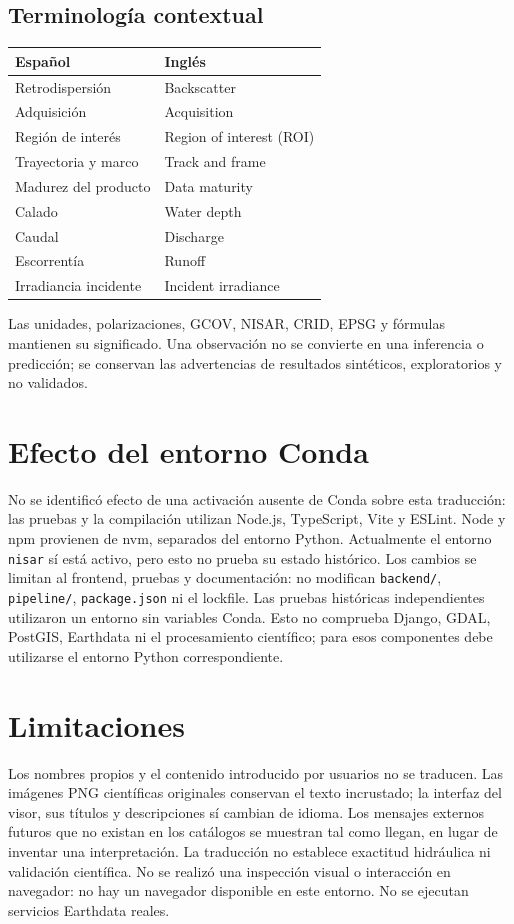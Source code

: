 \documentclass[11pt]{article}
\begin{document}
\subsection{Terminología contextual}
\begin{tabular}{ll}
Español & Inglés \\
\hline
Retrodispersión & Backscatter \\
Adquisición & Acquisition \\
Región de interés & Region of interest (ROI) \\
Trayectoria y marco & Track and frame \\
Madurez del producto & Data maturity \\
Calado & Water depth \\
Caudal & Discharge \\
Escorrentía & Runoff \\
Irradiancia incidente & Incident irradiance \\
\end{tabular}
Las unidades, polarizaciones, GCOV, NISAR, CRID, EPSG y fórmulas mantienen
su significado. Una observación no se convierte en una inferencia o predicción;
se conservan las advertencias de resultados sintéticos, exploratorios y no validados.
\section{Efecto del entorno Conda}
No se identificó efecto de una activación ausente de Conda sobre esta traducción:
las pruebas y la compilación utilizan Node.js, TypeScript, Vite y ESLint.
Node y npm provienen de nvm, separados del entorno Python. Actualmente el
entorno \texttt{nisar} sí está activo, pero esto no prueba su estado histórico.
Los cambios se limitan al frontend, pruebas y documentación: no modifican
\texttt{backend/}, \texttt{pipeline/}, \texttt{package.json} ni el lockfile.
Las pruebas históricas independientes utilizaron un entorno sin variables Conda.
Esto no comprueba Django, GDAL, PostGIS, Earthdata ni el procesamiento científico;
para esos componentes debe utilizarse el entorno Python correspondiente.
\section{Limitaciones}
Los nombres propios y el contenido introducido por usuarios no se traducen.
Las imágenes PNG científicas originales conservan el texto incrustado; la
interfaz del visor, sus títulos y descripciones sí cambian de idioma.
Los mensajes externos futuros que no existan en los catálogos se muestran tal
como llegan, en lugar de inventar una interpretación.
La traducción no establece exactitud hidráulica ni validación científica.
No se realizó una inspección visual o interacción en navegador: no hay un
navegador disponible en este entorno. No se ejecutan servicios Earthdata reales.
\end{document}

